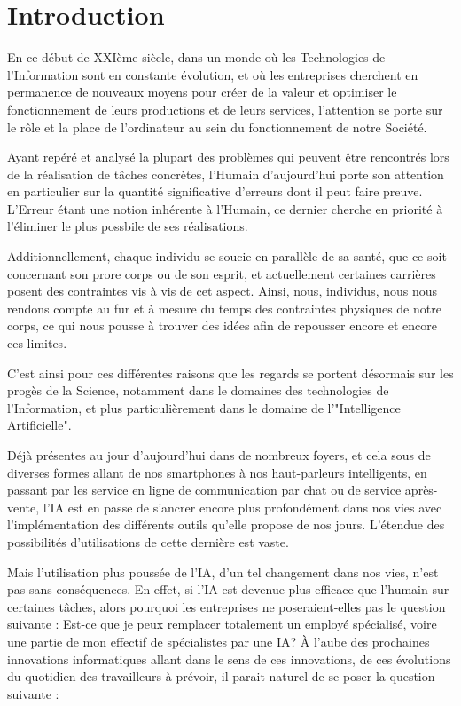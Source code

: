 \chapter*{Introduction}

En ce début de XXIème siècle, dans un monde où les Technologies de l'Information sont en constante évolution,
et où les entreprises cherchent en permanence de nouveaux moyens pour créer de la valeur
et optimiser le fonctionnement de leurs productions et de leurs services, l'attention se porte sur le rôle et la place de l'ordinateur au sein du fonctionnement de notre Société.\newline

Ayant repéré et analysé la plupart des problèmes qui peuvent être rencontrés lors de la réalisation de tâches concrètes, l'Humain d'aujourd'hui
porte son attention en particulier sur la quantité significative d'erreurs dont il peut faire preuve.
L'Erreur étant une notion inhérente à l'Humain, ce dernier cherche en priorité à l'éliminer le plus possbile de ses réalisations.\newline

Additionnellement, chaque individu se soucie en parallèle de sa santé, que ce soit concernant son prore corps ou de son esprit,
et actuellement certaines carrières posent des contraintes vis à vis de cet aspect.
Ainsi, nous, individus, nous nous rendons compte au fur et à mesure du temps des contraintes physiques de notre corps, ce qui nous pousse à trouver des
idées afin de repousser encore et encore ces limites.\newline

C'est ainsi pour ces différentes raisons que les regards se portent désormais sur les progès de la Science, notamment dans le domaines des technologies de l'Information,
et plus particulièrement dans le domaine de l'"Intelligence Artificielle".\newline

Déjà présentes au jour d'aujourd'hui dans de nombreux foyers, et cela sous de diverses formes allant de nos smartphones à nos haut-parleurs intelligents,
en passant par les service en ligne de communication par chat ou de service après-vente, l'IA est en passe de s'ancrer encore plus profondément dans nos vies
avec l'implémentation des différents outils qu'elle propose de nos jours. L'étendue des possibilités d'utilisations de cette dernière est vaste.\newline

Mais l'utilisation plus poussée de l'IA, d'un tel changement dans nos vies, n'est pas sans conséquences. En effet, si l'IA est devenue plus efficace que l'humain sur certaines tâches,
alors pourquoi les entreprises ne poseraient-elles pas le question suivante : Est-ce que je peux remplacer totalement un employé spécialisé, voire une partie de mon effectif de spécialistes par une IA?
À l'aube des prochaines innovations informatiques allant dans le sens de ces innovations, de ces évolutions du quotidien des travailleurs à prévoir, il parait naturel de se poser la question suivante :\newline

